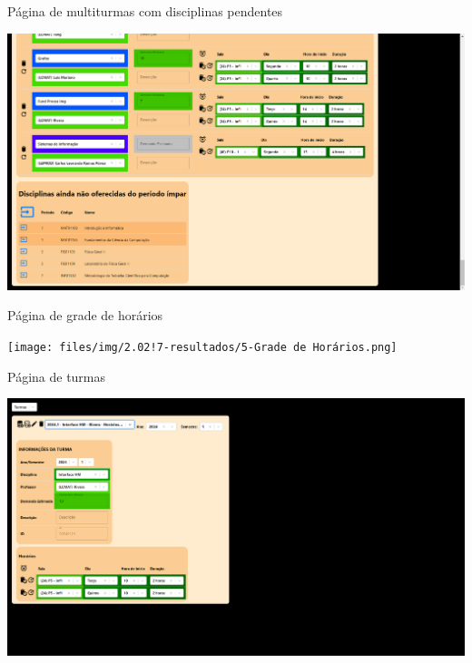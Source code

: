 \begin{MyCenteredFigure} \caption{Página de multiturmas com disciplinas pendentes} \label{fig:multiDisciplinas}
  \includegraphics[width=\textwidth]{files/img/2.02!7-resultados/4-Multiturmas-DisciplinasPendentes.png}
\end{MyCenteredFigure}

\begin{MyCenteredFigure} \caption{Página de grade de horários} \label{fig:grade}
  \texttt{[image: files/img/2.02!7-resultados/5-Grade de Horários.png]}
\end{MyCenteredFigure}

\begin{MyCenteredFigure} \caption{Página de turmas} \label{fig:turmas}
  \includegraphics[width=\textwidth]{files/img/2.02!7-resultados/6-Turmas.png}
\end{MyCenteredFigure}

